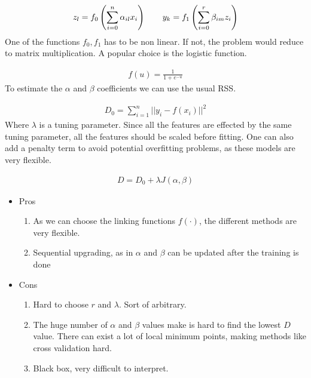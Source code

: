 \documentclass{article}
\begin{document}
\begin{align*}
    z_l = f_0 \left( \sum_{i=0}^{n} \alpha_{il}x_i \right) \hspace{20px} y_k = f_1 \left( \sum_{i=0}^{r} \beta_{im}z_i \right)
\end{align*}
One of the functions $f_0, f_1$ has to be non linear. If not, the problem would reduce to matrix multiplication. A popular choice is the logistic function.

\begin{align*}
    f(u) = \frac{1}{1+e^{-u}}
\end{align*}
To estimate the $\alpha$ and $\beta$ coefficients we can use the usual RSS.

\begin{align*}
    D_0 = \sum_{i=1}^{n} || y_i - f(x_i)||^2    
\end{align*}
Where $\lambda$ is a tuning parameter. Since all the features are effected by the same tuning parameter, all the features should be scaled before fitting. One can also add a penalty term to avoid potential overfitting problems, as these models are very flexible.

\begin{align*}
    D = D_0 + \lambda J(\alpha,\beta)
\end{align*}

\begin{itemize}
    \item Pros
    \begin{enumerate}
        \item As we can choose the linking functions $f(\cdot)$, the different methods are very flexible.
        \item Sequential upgrading, as in $\alpha$ and $\beta$ can be updated after the training is done
    \end{enumerate}
    \item Cons
    \begin{enumerate}
        \item Hard to choose $r$ and $\lambda$. Sort of arbitrary. 
        \item The huge number of $\alpha$ and $\beta$ values make is hard to find the lowest $D$ value. There can exist a lot of local minimum points, making methods like cross validation hard. 
        \item Black box, very difficult to interpret.
    \end{enumerate}
\end{itemize}
\end{document}
